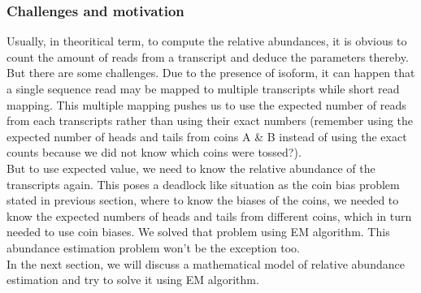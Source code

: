 \subsubsection{Challenges and motivation}
Usually, in theoritical term, to compute the relative abundances, it is obvious to count the amount of reads from a transcript and deduce the parameters thereby. But there are some challenges. Due to the presence of isoform, it can happen that a single sequence read may be mapped to multiple transcripts while short read mapping. This multiple mapping pushes us to use the expected number of reads from each transcripts rather than using their exact numbers (remember using the expected number of heads and tails from coins A \& B instead of using the exact counts because we did not know which coins were tossed?).\\
But to use expected value, we need to know the relative abundance of the transcripts again. This poses a deadlock like situation as the coin bias problem stated in previous section, where to know the biases of the coins, we needed to know the expected numbers of heads and tails from different coins, which in turn needed to use coin biases. We solved that problem using EM algorithm. This abundance estimation problem won't be the exception too.\\


In the next section, we will discuss a mathematical model of relative abundance estimation and try to solve it using EM algorithm.